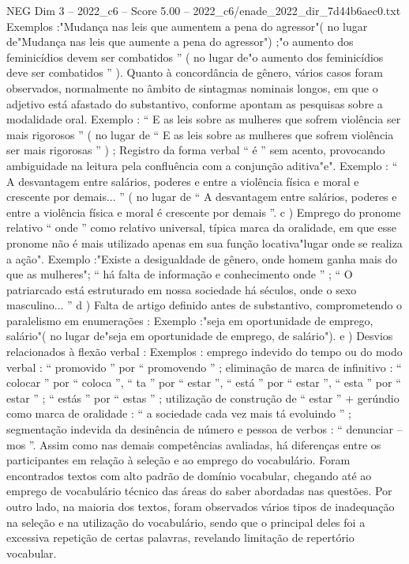 \begin{textsample}{NEG Dim 3 – 2022\_c6 – Score 5.00 – 2022\_c6/enade\_2022\_dir\_7d44b6aec0.txt}
Exemplos :"Mudança nas leis que aumentem a pena do agressor"( no lugar de"Mudança nas leis que aumente a pena do agressor") ;"o aumento dos feminicídios devem ser combatidos ” ( no lugar de"o aumento dos feminicídios deve ser combatidos ” ).
Quanto à concordância de gênero, vários casos foram observados, normalmente no âmbito de sintagmas nominais longos, em que o adjetivo está afastado do substantivo, conforme apontam as pesquisas sobre a modalidade oral.
Exemplo : “ E as leis sobre as mulheres que sofrem violência ser mais rigorosos ” ( no lugar de “ E as leis sobre as mulheres que sofrem violência ser mais rigorosas ” ) ; Registro da forma verbal “ é ” sem acento, provocando ambiguidade na leitura pela confluência com a conjunção aditiva"e".
Exemplo : “ A desvantagem entre salários, poderes e entre a violência física e moral e crescente por demais... ” ( no lugar de “ A desvantagem entre salários, poderes e entre a violência física e moral é crescente por demais ”. c ) Emprego do pronome relativo “ onde ” como relativo universal, típica marca da oralidade, em que esse pronome não é mais utilizado apenas em sua função locativa"lugar onde se realiza a ação".
Exemplo :"Existe a desigualdade de gênero, onde homem ganha mais do que as mulheres"; “ há falta de informação e conhecimento onde ” ; “ O patriarcado está estruturado em nossa sociedade há séculos, onde o sexo masculino... ” d ) Falta de artigo definido antes de substantivo, comprometendo o paralelismo em enumerações : Exemplo :"seja em oportunidade de emprego, salário"( no lugar de"seja em oportunidade de emprego, de salário"). e ) Desvios relacionados à flexão verbal : Exemplos : emprego indevido do tempo ou do modo verbal : “ promovido ” por “ promovendo ” ; eliminação de marca de infinitivo : “ colocar ” por “ coloca ”, “ ta ” por “ estar ”, “ está ” por “ estar ”, “ esta ” por “ estar ” ; “ estás ” por “ estas ” ; utilização de construção de “ estar ” + gerúndio como marca de oralidade : “ a sociedade cada vez mais tá evoluindo ” ; segmentação indevida da desinência de número e pessoa de verbos : “ denunciar – mos ”.
Assim como nas demais competências avaliadas, há diferenças entre os participantes em relação à seleção e ao emprego do vocabulário.
Foram encontrados textos com alto padrão de domínio vocabular, chegando até ao emprego de vocabulário técnico das áreas do saber abordadas nas questões.
Por outro lado, na maioria dos textos, foram observados vários tipos de inadequação na seleção e na utilização do vocabulário, sendo que o principal deles foi a excessiva repetição de certas palavras, revelando limitação de repertório vocabular.

\end{textsample}
